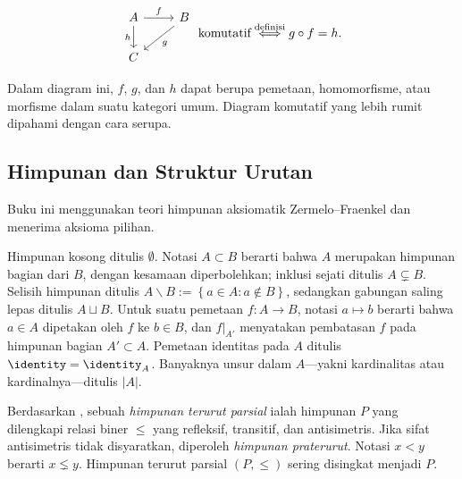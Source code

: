 \[\begin{tikzcd}
	A \arrow[r, "f"] \arrow[d, "h"'] & B \arrow[ld, "g"] \\
	C &
\end{tikzcd} \; \text{komutatif} \stackrel{\text{definisi}}{\iff} g \circ f = h. \]

Dalam diagram ini, $f$, $g$, dan $h$ dapat berupa pemetaan, homomorfisme,
atau morfisme dalam suatu kategori umum. Diagram komutatif yang lebih rumit
dipahami dengan cara serupa.

\subsection*{Himpunan dan Struktur Urutan}

Buku ini menggunakan teori himpunan aksiomatik Zermelo--Fraenkel dan menerima
aksioma pilihan.

Himpunan kosong ditulis $\emptyset$. Notasi $A \subset B$ berarti bahwa $A$
merupakan himpunan bagian dari $B$, dengan kesamaan diperbolehkan; inklusi
sejati ditulis $A \subsetneq B$. Selisih himpunan ditulis
$A \smallsetminus B := \left\{a \in A: a \notin B \right\}$, sedangkan gabungan
saling lepas ditulis $A \sqcup B$. Untuk suatu pemetaan $f: A \to B$, notasi
$a \mapsto b$ berarti bahwa $a \in A$ dipetakan oleh $f$ ke $b \in B$, dan
$f|_{A'}$ menyatakan pembatasan $f$ pada himpunan bagian $A' \subset A$.
Pemetaan identitas pada $A$ ditulis $\identity = \identity_A$. Banyaknya unsur
dalam $A$---yakni kardinalitas atau kardinalnya---ditulis $|A|$.

Berdasarkan \cite[Definisi~1.2.1]{Li1}, sebuah \emph{himpunan terurut parsial}
 ialah himpunan $P$
yang dilengkapi relasi biner $\leq$ yang refleksif, transitif, dan antisimetris.
Jika sifat antisimetris tidak disyaratkan, diperoleh \emph{himpunan
praterurut}. Notasi $x < y$ berarti $x \lneq y$. Himpunan terurut parsial $(P, \leq)$
sering disingkat menjadi $P$.

